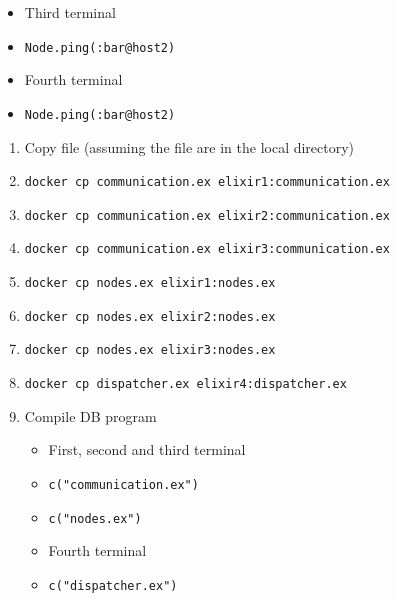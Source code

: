\documentclass{article}
\begin{document}
\begin{enumerate}
\begin{itemize}
   \item Third terminal
   \item[] \texttt{Node.ping(:bar@host2)}
   \item Fourth terminal
   \item[] \texttt{Node.ping(:bar@host2)}
  \end{itemize}
  \begin{enumerate}
   \item Copy file (assuming the file are in the local directory)
   \item[] \texttt{docker cp communication.ex elixir1:communication.ex}
   \item[] \texttt{docker cp communication.ex elixir2:communication.ex}
   \item[] \texttt{docker cp communication.ex elixir3:communication.ex}
   \item[] \texttt{docker cp nodes.ex elixir1:nodes.ex}
   \item[] \texttt{docker cp nodes.ex elixir2:nodes.ex}
   \item[] \texttt{docker cp nodes.ex elixir3:nodes.ex}
   \item[] \texttt{docker cp dispatcher.ex elixir4:dispatcher.ex}
   \item Compile DB program
   \begin{itemize}
   \item First, second and third terminal
   \item[] \texttt{c("communication.ex")}
   \item[] \texttt{c("nodes.ex")}
   \item Fourth terminal
   \item[] \texttt{c("dispatcher.ex")}
   \end{itemize}


\end{enumerate}
\end{enumerate}
\end{document}
